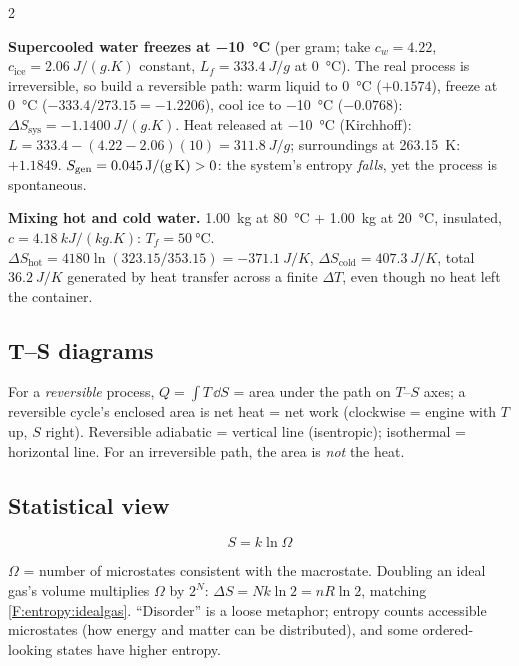 \begin{multicols}{2}
\begin{demobox}\textbf{Supercooled water freezes at \SI{-10}{\celsius}} (per gram; take $c_w=4.22$, $c_{\text{ice}}=\SI{2.06}{J/(g.K)}$ constant, $L_f=\SI{333.4}{J/g}$ at \SI{0}{\celsius}). The real process is irreversible, so build a reversible path: warm liquid to \SI{0}{\celsius} ($+0.1574$), freeze at \SI{0}{\celsius} ($-333.4/273.15=-1.2206$), cool ice to \SI{-10}{\celsius} ($-0.0768$): $\Delta S_{\text{sys}}=\SI{-1.1400}{J/(g.K)}$.
Heat released at \SI{-10}{\celsius} (Kirchhoff): $L=333.4-(4.22-2.06)(10)=\SI{311.8}{J/g}$; surroundings at \SI{263.15}{K}: $+1.1849$. $S_{\mathrm{gen}}=\SI{+0.045}{J/(g.K)}>0$: the system's entropy \emph{falls}, yet the process is spontaneous.\end{demobox}

\begin{demobox}\textbf{Mixing hot and cold water.} \SI{1.00}{kg} at \SI{80}{\celsius} + \SI{1.00}{kg} at \SI{20}{\celsius}, insulated, $c=\SI{4.18}{kJ/(kg.K)}$: $T_f=\SI{50}{\celsius}$. $\Delta S_{\text{hot}}=4180\ln(323.15/353.15)=\SI{-371.1}{J/K}$, $\Delta S_{\text{cold}}=\SI{+407.3}{J/K}$, total $\SI{+36.2}{J/K}$ generated by heat transfer across a finite $\Delta T$, even though no heat left the container.\end{demobox}

\subsection{T--S diagrams}\label{sec:ts}
For a \emph{reversible} process, $Q=\int T\,\dd S$ = area under the path on $T$--$S$ axes; a reversible cycle's enclosed area is net heat = net work (clockwise = engine with $T$ up, $S$ right). Reversible adiabatic = vertical line (isentropic); isothermal = horizontal line. For an irreversible path, the area is \emph{not} the heat.

\subsection{Statistical view}\label{sec:boltzmann}
\begin{formulabox}
\begin{equation}
S = k\ln\Omega \label{F:entropy:boltzmann}
\end{equation}
\end{formulabox}
$\Omega$ = number of microstates consistent with the macrostate. Doubling an ideal gas's volume multiplies $\Omega$ by $2^N$: $\Delta S=Nk\ln2=nR\ln2$, matching \eqref{F:entropy:idealgas}. ``Disorder'' is a loose metaphor; entropy counts accessible microstates (how energy and matter can be distributed), and some ordered-looking states have higher entropy.


\end{multicols}
